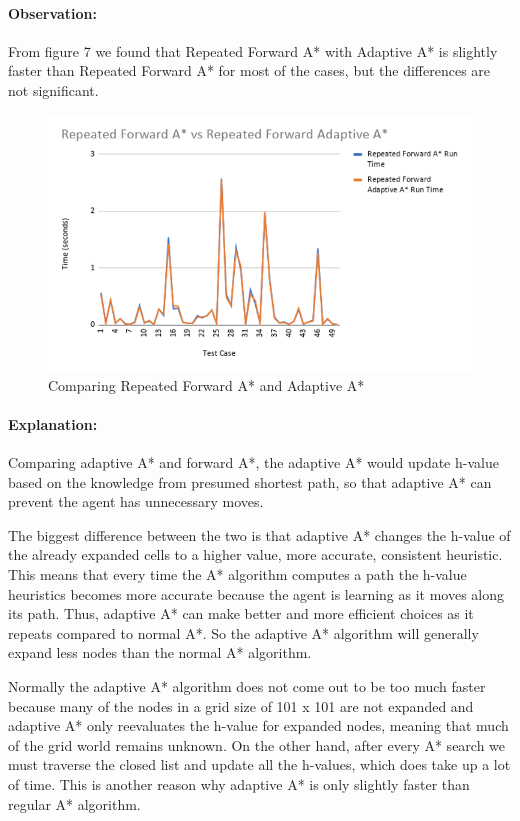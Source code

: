 \documentclass[11pt]{report}
\begin{document}
\paragraph{Observation:}
From figure 7 we found that Repeated Forward A* with Adaptive A* is slightly faster than Repeated Forward A* for most of the cases, but the differences are not significant. 

\begin{figure}[h]
\begin{center}
\includegraphics[width=1\textwidth]{Part5_1.jpg} 
\end{center}
\caption{Comparing Repeated Forward A* and Adaptive A*}
\end{figure}

\paragraph{Explanation:}
Comparing adaptive A* and forward A*, the adaptive A* would update h-value based on the knowledge from presumed shortest path, so that adaptive A* can prevent the agent has unnecessary moves.

The biggest difference between the two is that adaptive A* changes the h-value of the already expanded cells to a higher value, more accurate, consistent heuristic. This means that every time the A* algorithm computes a path the h-value heuristics becomes more accurate because the agent is learning as it moves along its path. Thus, adaptive A* can make better and more efficient choices as it repeats compared to normal A*. So the adaptive A* algorithm will generally expand less nodes than the normal A* algorithm.

Normally the adaptive A* algorithm does not come out to be too much faster because many of the nodes in a grid size of 101 x 101 are not expanded and adaptive A* only reevaluates the h-value for expanded nodes, meaning that much of the grid world remains unknown. On the other hand, after every A* search we must traverse the closed list and update all the h-values, which does take up a lot of time. This is another reason why adaptive A* is only slightly faster than regular A* algorithm.
\end{document}
